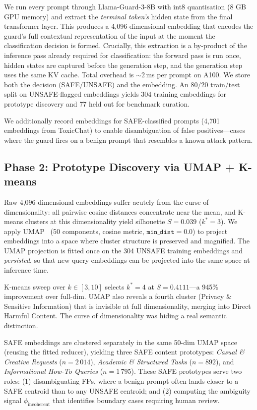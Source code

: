 \documentclass[letterpaper]{article}
\begin{document}
We run every prompt through Llama-Guard-3-8B with int8 quantisation (8 GB GPU memory)
and extract the \emph{terminal token's} hidden state from the final transformer layer.
This produces a 4,096-dimensional embedding that encodes the guard's full contextual
representation of the input at the moment the classification decision is formed.
Crucially, this extraction is a by-product of the inference pass already required for
classification: the forward pass is run once, hidden states are captured before the
generation step, and the generation step uses the same KV cache. Total overhead is
$\sim$2\,ms per prompt on A100. We store both the decision (SAFE/UNSAFE) and the
embedding. An 80/20 train/test split on UNSAFE-flagged embeddings yields 304 training
embeddings for prototype discovery and 77 held out for benchmark curation.

We additionally record embeddings for SAFE-classified prompts (4,701 embeddings from
ToxicChat) to enable disambiguation of false positives---cases where the guard fires
on a benign prompt that resembles a known attack pattern.

\subsection{Phase 2: Prototype Discovery via UMAP + K-means}
\label{sec:proto-discovery}

Raw 4,096-dimensional embeddings suffer acutely from the curse of dimensionality: all
pairwise cosine distances concentrate near the mean, and K-means clusters at this
dimensionality yield silhouette $S{=}0.039$ ($k^*{=}3$). We apply
UMAP~\cite{mcinnes2018umap} (50 components, cosine metric, $\texttt{min\_dist}=0.0$)
to project embeddings into a space where cluster structure is preserved and magnified.
The UMAP projection is fitted once on the 304 UNSAFE training embeddings and \emph{persisted},
so that new query embeddings can be projected into the same space at inference time.

K-means sweep over $k \in [3, 10]$ selects $k^*{=}4$ at $S{=}0.4111$---a 945\%
improvement over full-dim. UMAP also reveals a fourth cluster (Privacy \& Sensitive
Information) that is invisible at full dimensionality, merging into Direct Harmful Content.
The curse of dimensionality was hiding a real semantic distinction.

SAFE embeddings are clustered separately in the same 50-dim UMAP space (reusing the
fitted reducer), yielding three SAFE content prototypes: \emph{Casual \& Creative
Requests} ($n{=}2\,014$), \emph{Academic \& Structured Tasks} ($n{=}892$), and
\emph{Informational How-To Queries} ($n{=}1\,795$). These SAFE prototypes serve two
roles: (1) disambiguating FPs, where a benign prompt often lands closer to a SAFE
centroid than to any UNSAFE centroid; and (2) computing the ambiguity signal
$\phi_\text{incoherent}$ that identifies boundary cases requiring human review.
\end{document}
